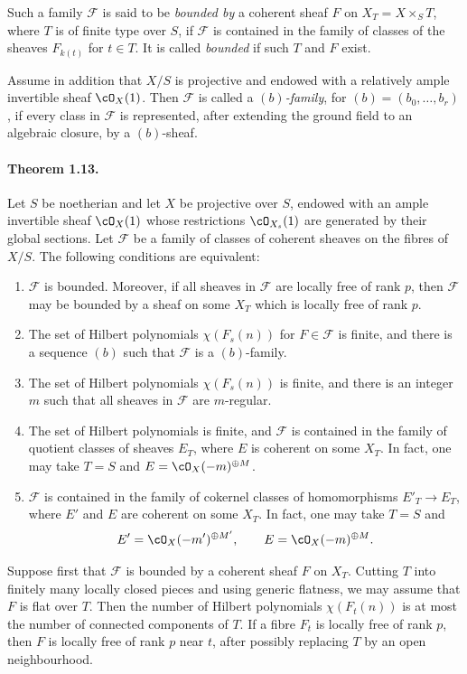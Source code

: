 \documentclass[11pt]{article}
\theoremstyle{plain}
\theoremstyle{definition}
\theoremstyle{remark}
\begin{document}
Such a family $\mathscr F$ is said to be \emph{bounded by} a coherent sheaf $F$ on $X_T=X\times_ST$, where $T$ is of finite type over $S$, if $\mathscr F$ is contained in the family of classes of the sheaves $F_{k(t)}$ for $t\in T$. It is called \emph{bounded} if such $T$ and $F$ exist.

Assume in addition that $X/S$ is projective and endowed with a relatively ample invertible sheaf $\cO_X(1)$. Then $\mathscr F$ is called a \emph{$(b)$-family}, for $(b)=(b_0,\ldots,b_r)$, if every class in $\mathscr F$ is represented, after extending the ground field to an algebraic closure, by a $(b)$-sheaf.

\paragraph{Theorem 1.13.}
Let $S$ be noetherian and let $X$ be projective over $S$, endowed with an ample invertible sheaf $\cO_X(1)$ whose restrictions $\cO_{X_s}(1)$ are generated by their global sections. Let $\mathscr F$ be a family of classes of coherent sheaves on the fibres of $X/S$. The following conditions are equivalent:
\begin{enumerate}[label=\roman*)]
\item $\mathscr F$ is bounded. Moreover, if all sheaves in $\mathscr F$ are locally free of rank $p$, then $\mathscr F$ may be bounded by a sheaf on some $X_T$ which is locally free of rank $p$.
\item The set of Hilbert polynomials $\chi(F_s(n))$ for $F\in\mathscr F$ is finite, and there is a sequence $(b)$ such that $\mathscr F$ is a $(b)$-family.
\item The set of Hilbert polynomials $\chi(F_s(n))$ is finite, and there is an integer $m$ such that all sheaves in $\mathscr F$ are $m$-regular.
\item The set of Hilbert polynomials is finite, and $\mathscr F$ is contained in the family of quotient classes of sheaves $E_T$, where $E$ is coherent on some $X_T$. In fact, one may take $T=S$ and $E=\cO_X(-m)^{\oplus M}$.
\item $\mathscr F$ is contained in the family of cokernel classes of homomorphisms $E'_T\to E_T$, where $E'$ and $E$ are coherent on some $X_T$. In fact, one may take $T=S$ and
\[
E'=\cO_X(-m')^{\oplus M'},\qquad E=\cO_X(-m)^{\oplus M}.
\]
\end{enumerate}

Suppose first that $\mathscr F$ is bounded by a coherent sheaf $F$ on $X_T$. Cutting $T$ into finitely many locally closed pieces and using generic flatness, we may assume that $F$ is flat over $T$. Then the number of Hilbert polynomials $\chi(F_t(n))$ is at most the number of connected components of $T$. If a fibre $F_t$ is locally free of rank $p$, then $F$ is locally free of rank $p$ near $t$, after possibly replacing $T$ by an open neighbourhood.
\end{document}
